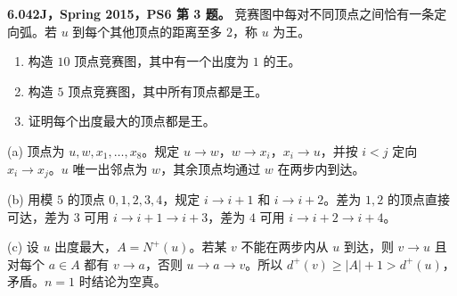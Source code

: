 \begin{exercise}\label{mit:6042-ps6-q3}
\textbf{6.042J，Spring 2015，PS6 第 3 题。}
竞赛图中每对不同顶点之间恰有一条定向弧。若 $u$ 到每个其他顶点的距离至多 $2$，称 $u$ 为王。
\begin{enumerate}[label=(\alph*)]
\item 构造 $10$ 顶点竞赛图，其中有一个出度为 $1$ 的王。
\item 构造 $5$ 顶点竞赛图，其中所有顶点都是王。
\item 证明每个出度最大的顶点都是王。
\end{enumerate}
\end{exercise}
\begin{solution}
(a) 顶点为 $u,w,x_1,\ldots,x_8$。规定 $u\to w$，$w\to x_i$，$x_i\to u$，并按 $i<j$ 定向 $x_i\to x_j$。$u$ 唯一出邻点为 $w$，其余顶点均通过 $w$ 在两步内到达。

(b) 用模 $5$ 的顶点 $0,1,2,3,4$，规定 $i\to i+1$ 和 $i\to i+2$。差为 $1,2$ 的顶点直接可达，差为 $3$ 可用 $i\to i+1\to i+3$，差为 $4$ 可用 $i\to i+2\to i+4$。

(c) 设 $u$ 出度最大，$A=N^+(u)$。若某 $v$ 不能在两步内从 $u$ 到达，则 $v\to u$ 且对每个 $a\in A$ 都有 $v\to a$，否则 $u\to a\to v$。所以 $d^+(v)\ge |A|+1>d^+(u)$，矛盾。$n=1$ 时结论为空真。
\end{solution}


